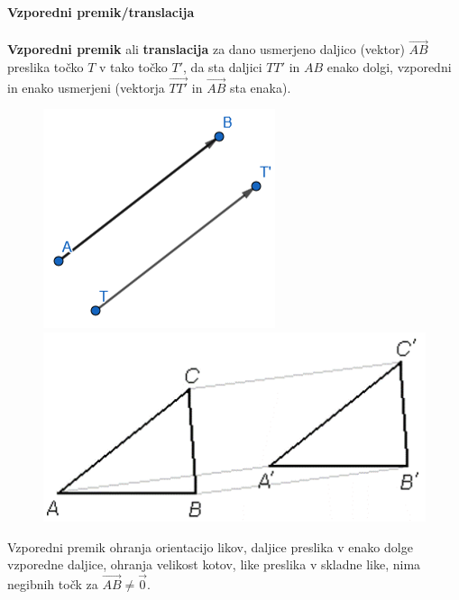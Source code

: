        \begin{frame}
            \large\textbf{Vzporedni premik/translacija}
            ~\\
            ~\\
            \normalsize
            \textbf{Vzporedni premik} ali \textbf{translacija} za dano usmerjeno daljico (vektor) $\overrightarrow{AB}$ preslika točko $T$ v tako točko $T'$, da sta daljici $TT'$ in $AB$ enako dolgi, vzporedni in enako usmerjeni (vektorja $\overrightarrow{TT'}$ in $\overrightarrow{AB}$ sta enaka). \\
            
            \begin{figure}
                \includegraphics[scale=0.5]{Slike in skice/Vzporedni_premik_tocke.png}
                \includegraphics[scale=0.5]{Slike in skice/Vzporedni_premik_trikotnika.png}
            \end{figure}

            Vzporedni premik ohranja orientacijo likov, daljice preslika v enako dolge vzporedne daljice, ohranja velikost kotov, like preslika v skladne like, nima negibnih točk za $\overrightarrow{AB}\neq \overrightarrow{0}$.

        \end{frame}


